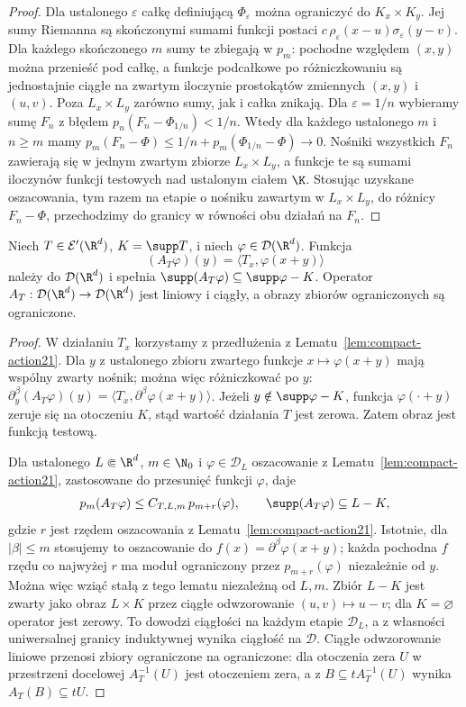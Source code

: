 \begin{proof}
Dla ustalonego $\varepsilon$ całkę definiującą
$\Phi_\varepsilon$ można ograniczyć do $K_x\times K_y$.
Jej sumy Riemanna są skończonymi sumami funkcji postaci
$c\,\rho_\varepsilon(x-u)\sigma_\varepsilon(y-v)$.
Dla każdego skończonego $m$ sumy te zbiegają w $p_m$:
pochodne względem $(x,y)$ można przenieść pod całkę,
a funkcje podcałkowe po różniczkowaniu są jednostajnie
ciągłe na zwartym iloczynie prostokątów zmiennych
$(x,y)$ i $(u,v)$. Poza $L_x\times L_y$ zarówno sumy,
jak i całka znikają. Dla $\varepsilon=1/n$ wybieramy
sumę $F_n$ z błędem $p_n(F_n-\Phi_{1/n})<1/n$.
Wtedy dla każdego ustalonego $m$ i $n\ge m$ mamy
$p_m(F_n-\Phi)\le 1/n+p_m(\Phi_{1/n}-\Phi)\to0$.
Nośniki wszystkich $F_n$ zawierają się w jednym zwartym
zbiorze $L_x\times L_y$, a funkcje te są sumami
iloczynów funkcji testowych nad ustalonym ciałem $\K$.
Stosując uzyskane oszacowania, tym razem na etapie
o nośniku zawartym w $L_x\times L_y$, do różnicy $F_n-\Phi$,
przechodzimy do granicy w równości obu działań na $F_n$.
\end{proof}

\begin{lemat}
\label{lem:convolution-transpose21}
Niech $T\in\mathcal E'(\R^d)$, $K=\supp T$, i niech
$\varphi\in\mathcal D(\R^d)$. Funkcja
\[
 (A_T\varphi)(y)=\langle T_x,\varphi(x+y)\rangle
\]
należy do $\mathcal D(\R^d)$ i spełnia
$\supp(A_T\varphi)\subseteq\supp\varphi-K$.
Operator $A_T:\mathcal D(\R^d)\to\mathcal D(\R^d)$
jest liniowy i ciągły, a obrazy zbiorów ograniczonych
są ograniczone.
\end{lemat}
\begin{proof}
W działaniu $T_x$ korzystamy z przedłużenia z
Lematu~\ref{lem:compact-action21}. Dla $y$ z ustalonego
zbioru zwartego funkcje $x\mapsto\varphi(x+y)$ mają
wspólny zwarty nośnik; można więc różniczkować po $y$:
$\partial_y^\beta(A_T\varphi)(y)=
\langle T_x,\partial^\beta\varphi(x+y)\rangle$.
Jeżeli $y\notin\supp\varphi-K$, funkcja
$\varphi(\cdot+y)$ zeruje się na otoczeniu $K$,
stąd wartość działania $T$ jest zerowa. Zatem obraz
jest funkcją testową.

Dla ustalonego $L\Subset\R^d$, $m\in\N_0$ i
$\varphi\in\mathcal D_L$ oszacowanie z
Lematu~\ref{lem:compact-action21}, zastosowane do
przesunięć funkcji $\varphi$, daje
\[
 p_m(A_T\varphi)\le C_{T,L,m}\,p_{m+r}(\varphi),
 \qquad \supp(A_T\varphi)\subseteq L-K,
\]
gdzie $r$ jest rzędem oszacowania z Lematu~\ref{lem:compact-action21}.
Istotnie, dla $|\beta|\le m$ stosujemy to oszacowanie do
$f(x)=\partial^\beta\varphi(x+y)$; każda pochodna $f$
rzędu co najwyżej $r$ ma moduł ograniczony przez
$p_{m+r}(\varphi)$ niezależnie od $y$.
Można więc wziąć stałą z tego lematu niezależną od $L,m$.
Zbiór $L-K$ jest zwarty jako obraz $L\times K$ przez
ciągłe odwzorowanie $(u,v)\mapsto u-v$; dla $K=\varnothing$
operator jest zerowy.
To dowodzi ciągłości na każdym etapie $\mathcal D_L$,
a z własności uniwersalnej granicy induktywnej
wynika ciągłość na $\mathcal D$. Ciągłe odwzorowanie liniowe
przenosi zbiory ograniczone na ograniczone: dla otoczenia
zera $U$ w przestrzeni docelowej $A_T^{-1}(U)$ jest
otoczeniem zera, a z $B\subseteq t A_T^{-1}(U)$
wynika $A_T(B)\subseteq tU$.
\end{proof}

